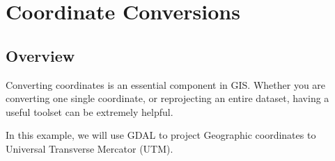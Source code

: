 %
%


\chapter*{Coordinate Conversions}


\section*{Overview}

Converting coordinates is an essential component in GIS.  Whether you are converting one single
coordinate, or reprojecting an entire dataset, having a useful toolset can be extremely helpful. 



In this example, we will use GDAL to project Geographic coordinates to Universal Transverse
Mercator (UTM).  


